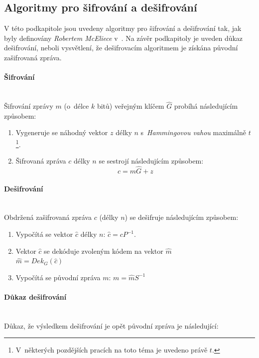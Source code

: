 \documentclass[thesis=M,czech,hidelinks]{FITthesis}[2012/06/26]
\newcommand{\0}{{\textcolor[gray]{0.80}{0}}}
\begin{document}
\subsection{Algoritmy pro šifrování a dešifrování}\label{kap_mceliece_algoritmy}

V této podkapitole jsou uvedeny algoritmy pro šifrování a dešifrování tak, jak
byly definovány \emph{Robertem McEliece} v~\cite{McEliece}. Na závěr podkapitoly
je uveden důkaz dešifrování, neboli vysvětlení, že dešifrovacím algoritmem je
získána původní zašifrovaná zpráva.

\paragraph{Šifrování} \hfil \\
Šifrování zprávy $m$ (o~délce $k$ bitů) veřejným klíčem $\hat{G}$ probíhá
následujícím způsobem:

\begin{enumerate}
    \item Vygeneruje se náhodný vektor $z$ délky $n$ s~\emph{Hammingovou vahou}
        maximálně $t$\footnote{
            V~některých pozdějších pracích na toto téma je
            uvedeno právě $t$.
        }.
    \item Šifrovaná zpráva $c$ délky $n$ se sestrojí následujícím způsobem:
        $$ c = m \hat{G} + z $$
\end{enumerate}

\paragraph{Dešifrování} \hfil \\
Obdržená zašifrovaná zpráva $c$ (délky $n$) se dešifruje následujícím způsobem:

\begin{enumerate}
    \item Vypočítá se vektor $\hat{c}$ délky $n$: $\hat{c} = c P^{-1}$.
    \item Vektor $\hat{c}$ se dekóduje zvoleným kódem na vektor $\hat{m}$ \\
        $\hat{m} = Dek_{G}\left(\hat{c}\right)$
    \item Vypočítá se původní zpráva $m$: $m = \hat{m} S^{-1}$
\end{enumerate}

\paragraph{Důkaz dešifrování} \hfil \\
Důkaz, že výsledkem dešifrování je opět původní zpráva je následující:
\end{document}
